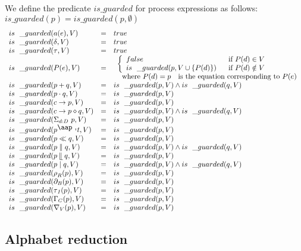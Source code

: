 \documentclass{article}
\begin{document}
We define the predicate $is\_guarded$ for process expressions as follows: $%
is\_guarded(p)=is\_guarded(p,\emptyset )$%
\[
\begin{array}{lll}
is\_guarded(a(e),V) & = & true \\ 
is\_guarded(\delta ,V) & = & true \\ 
is\_guarded(\tau ,V) & = & true \\ 
is\_guarded(P(e),V) & = & 
\begin{array}{l}
\left\{ 
\begin{array}{ll}
false & \text{if }P(d)\in V \\ 
is\_guarded(p,V\cup \{P(d)\}) & \text{if }P(d)\notin V%
\end{array}%
\right.  \\ 
\text{where }P(d)=p\text{ is the equation corresponding to }P(e)%
\end{array}
\\ 
is\_guarded(p+q,V) & = & is\_guarded(p,V)\wedge is\_guarded(q,V) \\ 
is\_guarded(p\cdot q,V) & = & is\_guarded(p,V) \\ 
is\_guarded(c\rightarrow p,V) & = & is\_guarded(p,V) \\ 
is\_guarded(c\rightarrow p\diamond q,V) & = & is\_guarded(p,V)\wedge
is\_guarded(q,V) \\ 
is\_guarded(\Sigma _{d:D}\ p,V) & = & is\_guarded(p,V) \\ 
is\_guarded(p^{\mathbin{\mbox{\aap ,}}}t,V) & = & is\_guarded(p,V) \\ 
is\_guarded(p\ll q,V) & = & is\_guarded(p,V) \\ 
is\_guarded(p\parallel q,V) & = & is\_guarded(p,V)\wedge is\_guarded(q,V) \\ 
is\_guarded(p\mathbin{\mathrel{\llfloor}}q,V) & = & is\_guarded(p,V) \\ 
is\_guarded(p\mid q,V) & = & is\_guarded(p,V)\wedge is\_guarded(q,V) \\ 
is\_guarded(\rho _{R}(p),V) & = & is\_guarded(p,V) \\ 
is\_guarded(\partial _{B}(p),V) & = & is\_guarded(p,V) \\ 
is\_guarded(\tau _{I}(p),V) & = & is\_guarded(p,V) \\ 
is\_guarded(\Gamma _{C}(p),V) & = & is\_guarded(p,V) \\ 
is\_guarded(\nabla _{V}(p),V) & = & is\_guarded(p,V)%
\end{array}%
\]%
\newpage 

\subsection{Alphabet reduction}
\end{document}
